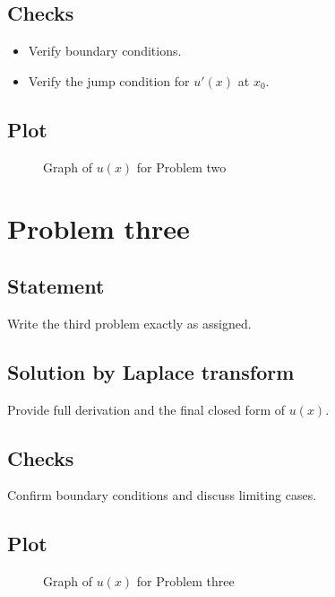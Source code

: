 \documentclass[12pt,a4paper]{article}
\begin{document}
\subsection{Checks}
\begin{itemize}[leftmargin=1.5em]
  \item Verify boundary conditions.
  \item Verify the jump condition for \(u'(x)\) at \(x_{0}\).
\end{itemize}

\subsection{Plot}
\begin{figure}[h]
  \centering
  \caption{Graph of \(u(x)\) for Problem two}
\end{figure}

\section{Problem three}
\subsection{Statement}
Write the third problem exactly as assigned.

\subsection{Solution by Laplace transform}
Provide full derivation and the final closed form of \(u(x)\).

\subsection{Checks}
Confirm boundary conditions and discuss limiting cases.

\subsection{Plot}
\begin{figure}[h]
  \centering
  \caption{Graph of \(u(x)\) for Problem three}
\end{figure}
\end{document}
